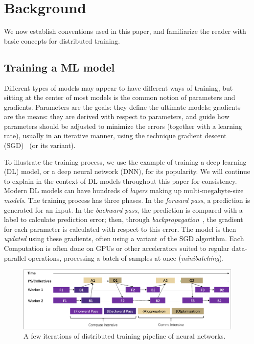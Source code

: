 \section{Background}
We now establish conventions used in this paper, and familiarize the reader with basic concepts for distributed training.


\subsection{Training a ML model}
Different types of models may appear to have different ways of training, but sitting at the center of most models is the common notion of parameters and gradients. Parameters are the goals: they define the ultimate models; gradients are the means: they are derived with respect to parameters, and guide how parameters should be adjusted to minimize the errors (together with a learning rate), usually in an iterative manner, using the technique gradient descent (SGD)~\cite{subgradient,DBLP:journals/corr/Ruder16} (or its variant). 

To illustrate the training process, we use the example of training a deep learning (DL) model, or a deep neural network (DNN), for its popularity. We will continue to explain in the context of DL models throughout this paper for consistency. Modern DL models can have hundreds of \textit{layers} making up multi-megabyte-size \textit{models}. The training process has three phases. In the \textit{forward pass}, a prediction is generated for an input. In the \textit{backward pass}, the prediction is compared with a label to calculate prediction error; then, through \textit{backpropagation}~\cite{backprop}, the gradient for each parameter
is calculated with respect to this error. The model is then \textit{updated} using these gradients, often using a variant of the SGD algorithm. Each Computation is often done on GPUs or other accelerators suited to regular data-parallel operations, processing a batch of samples at once (\textit{minibatching}).

\begin{figure}[t!]
	\centering
	\includegraphics[width=.6\linewidth, trim=2 3 3 3,clip]{Figures/distributedtraining.pdf}
	\caption{A few iterations of distributed training pipeline of neural networks.}
	\label{fig:distributedtraining}
\end{figure}

